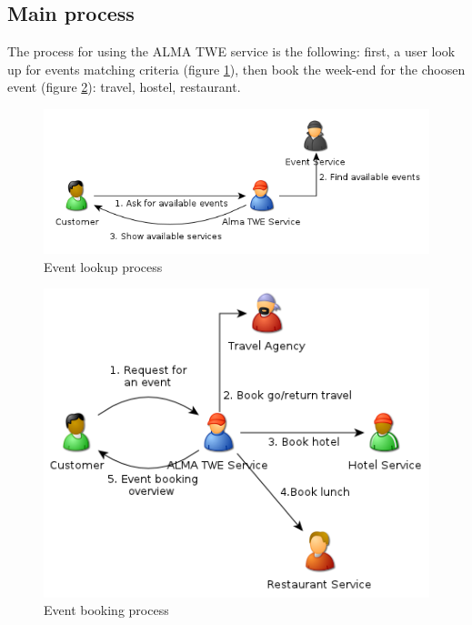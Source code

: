 \documentclass[a4paper]{article}
\begin{document}
		\subsection{Main process}
		
		
			The process for using the ALMA TWE service is the following: first, a user look up for events matching criteria (figure \ref{fig:lookup}), then book the week-end for the choosen event (figure \ref{fig:mainprocrequest}): travel, hostel, restaurant.
			
			\begin{figure}[htp]
				\centering
				\includegraphics[width=\textwidth]{lookupprocess.png}
				\caption{Event lookup process}
				\label{fig:lookup}
			\end{figure}
			
			\begin{figure}[htp]
				\centering
				\includegraphics[width=\textwidth]{bookingprocess.png}
				\caption{Event booking process}
				\label{fig:mainprocrequest}
			\end{figure}
			
\end{document}
